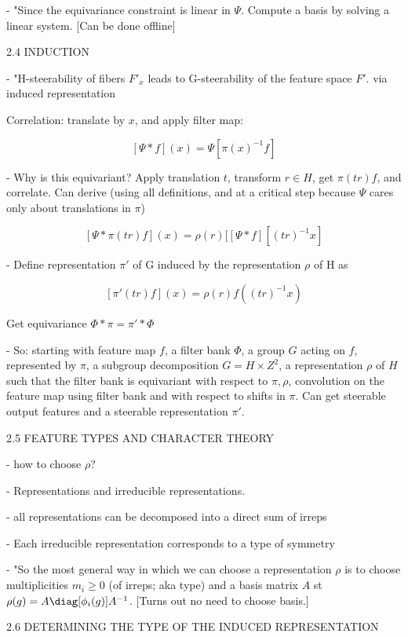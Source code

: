 \documentclass[english]{article}
\begin{document}
- "Since the equivariance constraint is linear in $\Psi$. Compute a basis by solving a linear system. [Can be done offline]

\item 2.4 INDUCTION

- "H-steerability of fibers $F'_x$  leads to G-steerability of the feature space $F'$. via induced representation

Correlation: translate by $x$, and apply filter map:

$$[\Psi * f](x) = \Psi[ \pi(x)^{-1} f]$$ 

- Why is this equivariant? Apply translation $t$, transform $r\in H$, get $\pi(tr)f$, and correlate. Can derive (using all definitions, and at a critical step because $\Psi$ cares only about translations in $\pi$) 

$$[\Psi * \pi(tr) f](x) = \rho(r)[[\Psi * f][ (tr)^{-1} x]
$$ 

- Define representation $\pi'$ of G induced by the representation $\rho$ of H  as

$$[\pi'(tr)f](x) = \rho(r) f((tr)^{-1}x)$$

Get equivariance $\Phi*\pi=\pi'*\Phi$

- So: starting with feature map $f$, a filter bank $\Phi$, a group $G$ acting on $f$, represented by $\pi$, a subgroup decomposition $G = H\times Z^2$, a representation $\rho$ of $H$ such that the filter bank is equivariant with respect to $\pi,\rho$, convolution on the feature map using filter bank and with respect to shifts in $\pi$. Can get  steerable output features and a steerable representation $\pi'$.

\item 2.5 FEATURE TYPES AND CHARACTER THEORY

- how to choose $\rho$?

- Representations and irreducible representations. 

- all representations can be decomposed into a direct sum of irreps

- Each irreducible representation corresponds to a type of symmetry

- "So the most general way in which we can choose a representation $\rho$ is to choose multiplicities $m_i \ge 0$ (of irreps; aka type) and a basis matrix $A$ st $\rho(g) = A \diag[\phi_i(g)]A^{-1}$. [Turns  out no need to choose basis.]


\item 2.6 DETERMINING THE TYPE OF THE INDUCED REPRESENTATION
\end{document}
